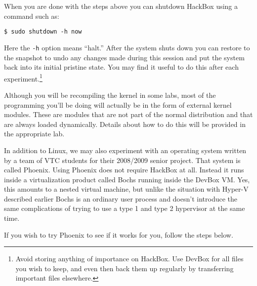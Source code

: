 \documentclass[twocolumn]{article}
\begin{document}
When you are done with the steps above you can shutdown HackBox using a command such as:
\begin{Verbatim}
$ sudo shutdown -h now
\end{Verbatim}
Here the \texttt{-h} option means ``halt.'' After the system shuts down you can restore to the
snapshot to undo any changes made during this session and put the system back into its initial
pristine state. You may find it useful to do this after each experiment.\footnote{Avoid storing
  anything of importance on HackBox. Use DevBox for all files you wish to keep, and even then
  back them up regularly by transferring important files elsewhere.}

Although you will be recompiling the kernel in some labs, most of the programming you'll be
doing will actually be in the form of external kernel modules. These are modules that are not
part of the normal distribution and that are always loaded dynamically. Details about how to do
this will be provided in the appropriate lab.

In addition to Linux, we may also experiment with an operating system written by a team of VTC
students for their 2008/2009 senior project. That system is called Phoenix. Using Phoenix does
not require HackBox at all. Instead it runs inside a virtualization product called Bochs running
inside the DevBox VM. Yes, this amounts to a nested virtual machine, but unlike the situation
with Hyper-V described earlier Bochs is an ordinary user process and doesn't introduce the same
complications of trying to use a type 1 and type 2 hypervisor at the same time.

If you wish to try Phoenix to see if it works for you, follow the steps below.
\end{document}
